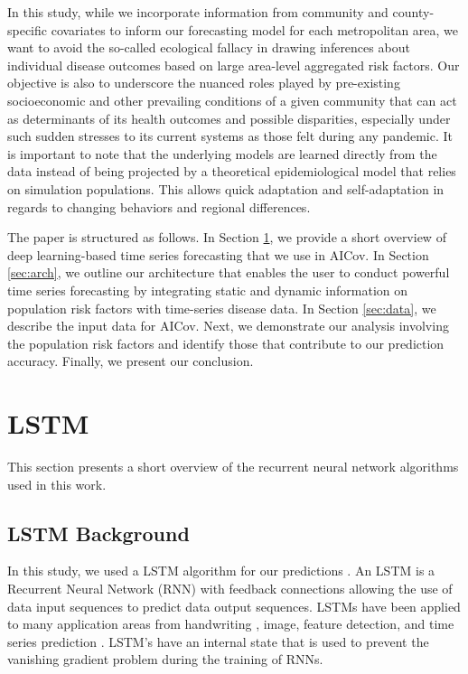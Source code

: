 \documentclass[letterpaper, inpress]{jds} %
\renewcommand{\_}{%
    \textunderscore\hspace{0pt}%
}
\begin{document}
In this study, while we incorporate information from community and
county-specific covariates to inform our forecasting model for each
metropolitan area, we want to avoid the so-called ecological fallacy
in drawing inferences about individual disease outcomes based on large
area-level aggregated risk factors. Our objective is also to
underscore the nuanced roles played by pre-existing socioeconomic and
other prevailing conditions of a given community that can act as
determinants of its health outcomes and possible disparities,
especially under such sudden stresses to its current systems as those
felt during any pandemic.  It is important to note that the underlying
models are learned directly from the data instead of being projected
by a theoretical epidemiological model that relies on simulation
populations. This allows quick adaptation and self-adaptation in
regards to changing behaviors and regional differences.

The paper is structured as follows. In Section \ref{sec:lstm-theory},
we provide a short overview of deep learning-based time series
forecasting that we use in AICov. In Section \ref{sec:arch}, we
outline our architecture that enables the user to conduct powerful
time series forecasting by integrating static and dynamic information
on population risk factors with time-series disease data. In Section
\ref{sec:data}, we describe the input data for AICov. Next, we
demonstrate our analysis involving the population risk factors and
identify those that contribute to our prediction accuracy. Finally, we
present our conclusion.


\section{LSTM}
\label{sec:lstm-theory}

This section presents a short overview of the recurrent neural network algorithms used in this work.


\subsection{LSTM Background}
\label{sec:lstm-background}

In this study, we used a LSTM algorithm for
our predictions \citep{www-keras-lstm,Hochreiter1997-dk}. An LSTM is a
Recurrent Neural Network (RNN) \citep{Rumelhart1986-li} with feedback
connections allowing the use of data input sequences to predict data
output sequences. LSTMs have been applied to many application areas
from handwriting \citep{Graves2009-qb}, image, feature detection, and
time series prediction \citep{Schmidhuber2005-oy}. LSTM's have an
internal state that is used to prevent the vanishing gradient problem
\citep{Hochreiter1991-mp} during the training of RNNs.
\end{document}
